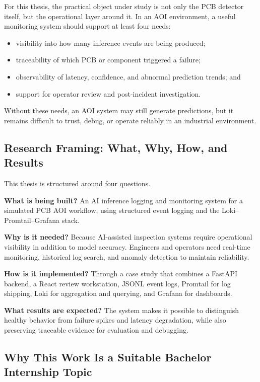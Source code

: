 \documentclass[12pt,a4paper]{article}
\begin{document}
For this thesis, the practical object under study is not only the PCB detector
itself, but the operational layer around it. In an AOI environment, a useful
monitoring system should support at least four needs:
\begin{itemize}
    \item visibility into how many inference events are being produced;
    \item traceability of which PCB or component triggered a failure;
    \item observability of latency, confidence, and abnormal prediction trends; and
    \item support for operator review and post-incident investigation.
\end{itemize}

Without these needs, an AOI system may still generate predictions, but
it remains difficult to trust, debug, or operate reliably in an industrial
environment.

\subsection{Research Framing: What, Why, How, and Results}

This thesis is structured around four questions.

\textbf{What is being built?}
An AI inference logging and monitoring system for a simulated PCB AOI workflow, using
structured event logging and the Loki--Promtail--Grafana stack.

\textbf{Why is it needed?}
Because AI-assisted inspection systems require operational visibility in
addition to model accuracy. Engineers and operators need real-time monitoring,
historical log search, and anomaly detection to maintain reliability.

\textbf{How is it implemented?}
Through a case study that combines a FastAPI backend, a
React review workstation, JSONL event logs, Promtail for log shipping, Loki for
aggregation and querying, and Grafana for dashboards.

\textbf{What results are expected?}
The system makes it possible to distinguish healthy behavior from failure
spikes and latency degradation, while also preserving traceable evidence for
evaluation and debugging.


\subsection{Why This Work Is a Suitable Bachelor Internship Topic}
\end{document}
